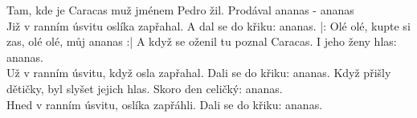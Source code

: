 \ve{}
Tam, kde je Caracas muž jménem Pedro žil.
Prodával ananas - ananas\\
Již v ranním úsvitu oslíka zapřahal.
A dal se do křiku: ananas.
\cho{}
|: Olé olé, kupte si zas, olé olé, můj ananas :|
\ve{}
A když se oženil tu poznal Caracas.
I jeho ženy hlas: ananas.\\
Už v ranním úsvitu, když osla zapřahal.
Dali se do křiku: ananas.
\cho{}
\ve{}
Když přišly dětičky, byl slyšet jejich hlas.
Skoro den celičký: ananas.\\
Hned v ranním úsvitu, oslíka zapřáhli.
Dali se do křiku: ananas.
\cho{}
\esong{}